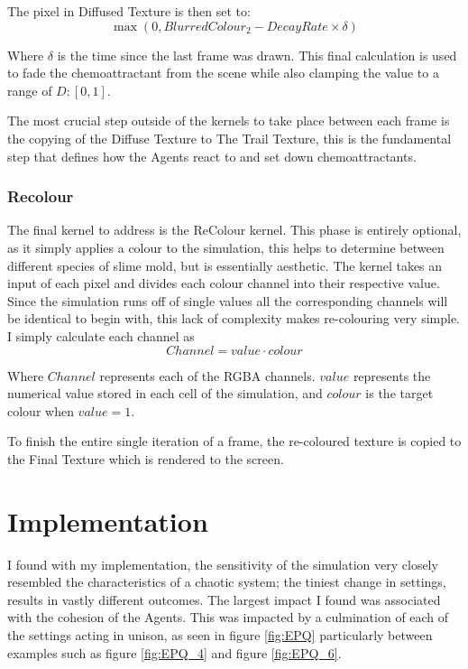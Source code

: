 \documentclass[]{report}
\begin{document}
The pixel in Diffused Texture is then set to:
\begin{equation}
    \max{(0, BlurredColour_2 - DecayRate \times \delta)}
\end{equation}

Where $\delta$ is the time since the last frame was drawn. This final calculation is used to fade the \gls{chemoattractant} from the scene while also clamping the value to a range of $D:[0,1]$.

The most crucial step outside of the kernels to take place between each frame is the copying of the Diffuse Texture to The Trail Texture, this is the fundamental step that defines how the Agents react to and set down \glspl{chemoattractant}.

\subsubsection{Recolour}

The final kernel to address is the ReColour kernel. This phase is entirely optional, as it simply applies a colour to the simulation, this helps to determine between different species of slime mold, but is essentially aesthetic. The kernel takes an input of each pixel and divides each colour channel into their respective value. Since the simulation runs off of single values all the corresponding channels will be identical to begin with, this lack of complexity makes re-colouring very simple. I simply calculate each channel as
\begin{equation}    
    Channel = value \cdot colour
\end{equation}

Where $Channel$ represents each of the RGBA channels. $value$ represents the numerical value stored in each cell of the simulation, and $colour$ is the target colour when  $value = 1$.

To finish the entire single iteration of a frame, the re-coloured texture is copied to the Final Texture which is rendered to the screen.

\section{Implementation}

I found with my implementation, the sensitivity of the simulation very closely resembled the characteristics of a chaotic system; the tiniest change in settings, results in vastly different outcomes. The largest impact I found was associated with the cohesion of the Agents. This was impacted by a culmination of each of the settings acting in unison, as seen in figure  \ref{fig:EPQ} particularly between examples such as figure \ref{fig:EPQ_4} and figure \ref{fig:EPQ_6}.
\end{document}
